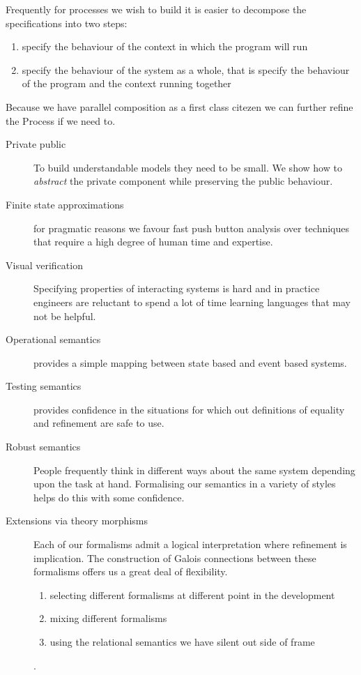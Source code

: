 \documentclass[]{article}
\begin{document}
Frequently for processes we wish to build it is easier to decompose the specifications into two steps:
\begin{enumerate}
\item specify the behaviour of the context in which the program will run
\item specify the behaviour of the system as a whole, that is specify the behaviour of the program and the context running together
\end{enumerate} 



Because we have parallel composition as a first class citezen  we can further refine the Process if we need to.

{\color{red}
\begin{description}
\item[Private public] To build understandable models they need to be small. We show how to \emph{abstract} the private component while preserving the public behaviour. 
\item[Finite state approximations] for pragmatic reasons we favour fast push button analysis over techniques that require a high degree of human time and expertise. 
\item[Visual verification] Specifying properties of interacting systems  is hard and in practice engineers  are reluctant to spend a lot of time learning languages that may not be helpful. 
\item[Operational semantics] provides a simple mapping between state based and event based systems.
\item[Testing semantics] provides confidence in the situations for which  out definitions of equality and refinement are safe to use.

\item[Robust semantics] People frequently think in different ways about the same system depending upon the task at hand.  Formalising our semantics in a variety of styles  helps do this with some confidence.  

\item [Extensions via theory morphisms] Each of our formalisms admit  a logical interpretation where refinement is implication. The construction of Galois connections between these formalisms offers us a great deal of flexibility.  \begin{enumerate}
\item  selecting different formalisms at different point in the development
\item  mixing different formalisms
\item  using the relational semantics we have silent out side of frame
\end{enumerate}.


\end{description}}
\end{document}
